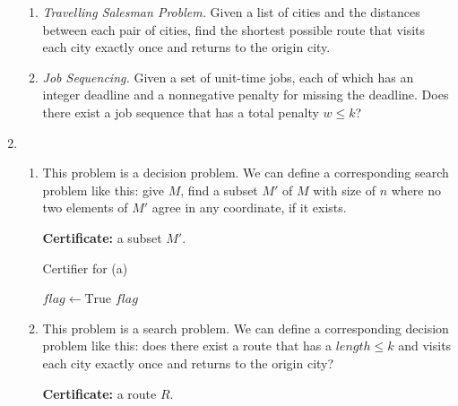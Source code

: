 \documentclass[12pt,a4paper]{article}
\makeatletter
\newtheorem*{solution}{Solution}
\theoremstyle{definition}
\renewenvironment{solution}[1][Solution] {\par\pushQED{\qed}\normalfont\topsep6\p@\@plus6\p@\relax\trivlist\item[\hskip\labelsep\bfseries#1\@addpunct{.}]\ignorespaces}{\popQED\endtrivlist\@endpefalse} \makeatother
\makeatother
\begin{document}
\begin{enumerate}
\begin{enumerate}
	    \item 
	    \textit{Travelling Salesman Problem.} Given a list of cities and the distances between each pair of cities, find the shortest possible route that visits each city exactly once and returns to the origin city.
	    
	    \item
	    \textit{Job Sequencing.} Given a set of unit-time jobs, each of which has an integer deadline and a nonnegative penalty for missing the deadline. Does there exist a job sequence that has a total penalty $w\leqslant k$?
	    
	\end{enumerate}
	\begin{solution}
	~
	\begin{enumerate}
	    \item 
	    This problem is a decision problem. We can define a corresponding search problem like this: give $M$, find a subset $M'$ of $M$ with size of $n$ where no two elements of $M'$ agree in any coordinate, if it exists.
	    
	    \textbf{Certificate:} a subset $M'$.
	    
	    \begin{minipage}[t]{0.85\textwidth}         \begin{algorithm}[H]         
	    \BlankLine         
	    \caption{Certifier for (a)}
	    \label{Alg-certifier-a}
	    $flag\leftarrow\text{True}$\;
	    \Return $flag$\;
	    \end{algorithm}         
	    \end{minipage}
	    \item
	    This problem is a search problem. We can define a corresponding decision problem like this: does there exist a route that has  a $length\le k$ and visits each city exactly once and returns to the origin city?
	    
	     \textbf{Certificate:} a route $R$.
	     

\end{enumerate}
\end{solution}
\end{enumerate}
\end{document}
